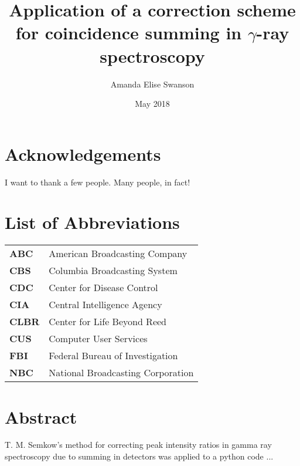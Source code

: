 \documentclass[12pt,twoside]{reedthesis}
\title{Application of a correction scheme for coincidence summing in $\gamma$-ray spectroscopy}
\author{Amanda Elise Swanson}
\date{May 2018}
\begin{document}
  \maketitle
  \frontmatter %
  \pagestyle{empty} %

    \chapter*{Acknowledgements}
	I want to thank a few people. Many people, in fact!

    
    \chapter*{List of Abbreviations}

	\begin{table}[h]
	\centering %
	\begin{tabular}{ll}
		\textbf{ABC}  	&  American Broadcasting Company \\
		\textbf{CBS}  	&  Columbia Broadcasting System\\
		\textbf{CDC}  	&  Center for Disease Control \\
		\textbf{CIA}  	&  Central Intelligence Agency\\
		\textbf{CLBR} 	&  Center for Life Beyond Reed\\
		\textbf{CUS}  	&  Computer User Services\\
		\textbf{FBI}  	&  Federal Bureau of Investigation\\
		\textbf{NBC}  	&  National Broadcasting Corporation\\
	\end{tabular}
	\end{table}
	


    \chapter*{Abstract}
        T. M. Semkow's method for correcting peak intensity ratios in gamma ray spectroscopy due to summing in detectors was applied to a python code ...	
\end{document}
